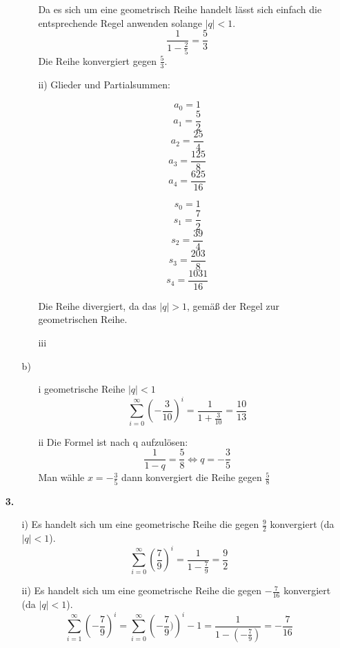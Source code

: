 \documentclass[a4paper]{scrartcl}
\begin{document}
\begin{enumerate}
\begin{enumerate}
\begin{enumerate}
                    Da es sich um eine geometrisch Reihe handelt lässt sich einfach die entsprechende Regel anwenden solange $|q| < 1$.
                    $$\frac{1}{1-\frac{2}{5}}=\frac{5}{3}$$
                    Die Reihe konvergiert gegen $\frac{5}{3}$.
                \item[ii)]
                    Glieder und Partialsummen:
                    
                    \begin{minipage}[b]{0.3\textwidth}
                    $$a_0 = 1$$
                    $$a_1 = \frac{5}{2}$$
                    $$a_2 = \frac{25}{4}$$
                    $$a_3 = \frac{125}{8}$$
                    $$a_4 = \frac{625}{16}$$
                    \end{minipage}
                    \begin{minipage}[b]{0.3\textwidth}
                    $$s_0 = 1$$
                    $$s_1 = \frac{7}{2}$$
                    $$s_2 = \frac{39}{4}$$
                    $$s_3 = \frac{203}{8}$$
                    $$s_4 = \frac{1031}{16}$$
                    \end{minipage}
                    Die Reihe divergiert, da das $|q| > 1$, gemäß der Regel zur geometrischen Reihe.
                \item[iii]

            \end{enumerate}
            \item[b)]
                \begin{enumerate}
                    \item[i]
                        geometrische Reihe $|q| < 1$
                        $$\sum_{i=0}^{\infty}\left( -\frac{3}{10}\right)^i = \frac{1}{1+\frac{3}{10}}=\frac{10}{13}$$
                    \item[ii]
                        Die Formel ist nach q aufzulösen:
                        $$\frac{1}{1-q}=\frac{5}{8} \Leftrightarrow q=-\frac{3}{5}$$
                        Man wähle $x=-\frac{3}{5}$ dann konvergiert die Reihe gegen $\frac{5}{8}$
                \end{enumerate}   

        \end{enumerate}
    \item[\textbf{3.}]
        \begin{enumerate}
            \item[i)]
                Es handelt sich um eine geometrische Reihe die gegen $\frac{9}{2}$
                konvergiert (da $|q| < 1$).
                $$\sum_{i=0}^{\infty}\left(\frac{7}{9}\right)^i = \frac{1}{1-\frac{7}{9}}= \frac{9}{2}$$
            \item[ii)]
                Es handelt sich um eine geometrische Reihe die gegen $-\frac{7}{16}$
                konvergiert (da $|q| < 1$).
                $$\sum_{i=1}^{\infty}\left(-\frac{7}{9}\right)^i = \sum_{i=0}^{\infty}\left(-\frac{7}{9})\right)^i -1 
                = \frac{1}{1-(- \frac{7}{9}) }= -\frac{7}{16}$$
        \end{enumerate}
        

\end{enumerate}
\end{document}
